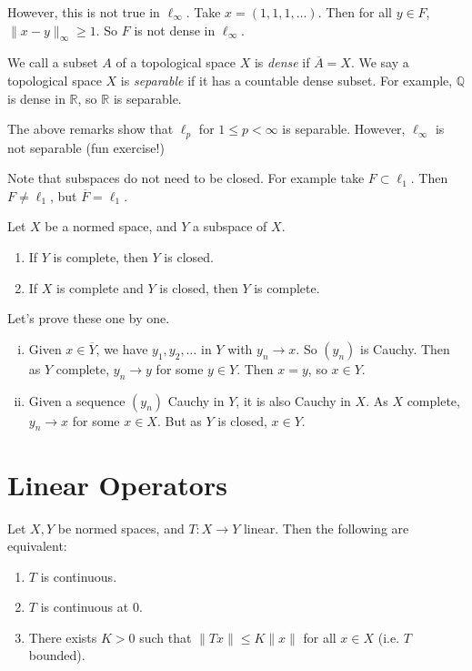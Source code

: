 \documentclass[12pt]{article}
\begin{document}
However, this is not true in $\ell_{\infty}$. Take $x = (1, 1, 1, \ldots)$. Then for all $y \in F$, $\|x -y\|_\infty \geq 1$. So $F$ is not dense in $\ell_\infty$.

We call a subset $A$ of a topological space $X$ is \emph{dense} if $\overline{A} = X$. We say a topological space $X$ is \emph{separable} if it has a countable dense subset. For example, $\mathbb{Q}$ is dense in $\mathbb{R}$, so $\mathbb{R}$ is separable.

The above remarks show that $\ell_p$ for $1 \leq p < \infty$ is separable. However, $\ell_\infty$ is not separable (fun exercise!)

Note that subspaces do not need to be closed. For example take $F \subset \ell_1$. Then $F \neq \ell_1$, but $\overline{F} = \ell_1$.

\begin{proposition}
	Let $X$ be a normed space, and $Y$ a subspace of $X$.
	\begin{enumerate}[\normalfont(i)]
		\item If $Y$ is complete, then $Y$ is closed.
		\item If $X$ is complete and $Y$ is closed, then $Y$ is complete.
	\end{enumerate}
\end{proposition}

\begin{proofbox}
	Let's prove these one by one.
	\begin{enumerate}[(i)]
		\item Given $x \in \overline{Y}$, we have $y_1, y_2, \ldots$ in $Y$ with $y_n \to x$. So $(y_n)$ is Cauchy. Then as $Y$ complete, $y_n \to y$ for some $y \in Y$. Then $x = y$, so $x \in Y$.
		\item Given a sequence $(y_n)$ Cauchy in $Y$, it is also Cauchy in $X$. As $X$ complete, $y_n \to x$ for some $x \in X$. But as $Y$ is closed, $x \in Y$.
	\end{enumerate}
\end{proofbox}

\newpage

\section{Linear Operators}
\label{sec:linear_ops}

\begin{theorem}
	Let $X, Y$ be normed spaces, and $T : X \to Y$ linear. Then the following are equivalent:
	\begin{enumerate}[\normalfont(i)]
		\item $T$ is continuous.
		\item $T$ is continuous at $0$.
		\item There exists $K > 0$ such that $\|Tx\| \leq K\|x\|$ for all $x \in X$ (i.e. $T$ bounded).
	\end{enumerate}
\end{theorem}
\end{document}
